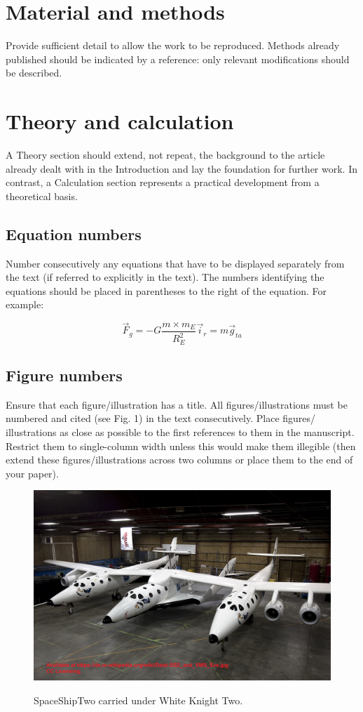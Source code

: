 \documentclass[]{IAC_style}
\begin{document}
\section{Material and methods}
Provide sufficient detail to allow the work to be reproduced. Methods already published should be indicated by a reference: only relevant modifications should be described.

\section{Theory and calculation}
A Theory section should extend, not repeat, the background to the article already dealt with in the Introduction and lay the foundation for further work. In contrast, a Calculation section represents a practical development from a theoretical basis.

\subsection{Equation numbers}
Number consecutively any equations that have to be displayed separately from the text (if referred to explicitly in the text). The numbers identifying the equations should be placed in parentheses to the right of the equation. For example:

\begin{equation}
\vec{F}_g = -G \frac{m \times m_E}{R_E^2} \vec{i}_r = m \vec{g}_{ta}
\end{equation}

\subsection{Figure numbers}
Ensure that each figure/illustration has a title. All figures/illustrations must be numbered and cited (see Fig. 1) in the text consecutively. Place figures/ illustrations as close as possible to the first references to them in the manuscript. Restrict them to single-column width unless this would make them illegible (then extend these figures/illustrations across two columns or place them to the end of your paper).

\begin{figure}[H]
\centering
\includegraphics[width=\columnwidth]{pics/example.jpg}
\label{fig:example}
\caption{SpaceShipTwo carried under White Knight Two.}
\end{figure}
\end{document}
